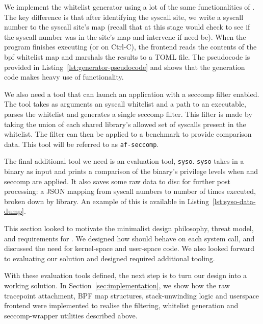 We implement the whitelist generator using a lot of the same functionalities of
\af. The key difference is that after identifying the syscall site, we write a
syscall number to the syscall site's map (recall that at this stage \af would
check to see if the syscall number was in the site's map and intervene if need
be). When the program finishes executing (or on Ctrl-C), the frontend reads the
contents of the bpf whitelist map and marshals the results to a TOML file.
The pseudocode is provided in Listing~\ref{lst:generator-pseudocode} and shows
that the generation code makes heavy use of \afg functionality.

We also need a tool that can launch an application with a seccomp filter enabled.
The tool takes as arguments an \af syscall whitelist
and a path to an executable, parses the whitelist and generates a single
seccomp filter. This filter is made by taking the union of each shared 
library's allowed set of syscalls present in the \af whitelist. The filter can
then be applied to a benchmark to provide comparison data. This tool will be
referred to as \texttt{af-seccomp}.

The final additional tool we need is an evaluation tool, \texttt{syso}.
\texttt{syso} takes in a binary as input and prints a comparison of the 
binary's privilege levels  when \af and seccomp are applied. It also saves
some raw data to disc for further post processing: a JSON mapping from
syscall numbers to number of times executed, broken down by library. An
example of this is available in Listing~\ref{lst:syso-data-dump}.

This section looked to motivate the minimalist design philosophy, threat model,
and requirements for \af. We designed how \af should behave on each system call,
and discussed the need for kernel-space and user-space code. We also looked
forward to evaluating our solution and designed required additional tooling.

With these evaluation tools defined, the next step is to turn our design into a
working solution. In Section \ref{sec:implementation}, we show how the raw 
tracepoint attachment, BPF map structures, stack-unwinding logic and userspace 
frontend were implemented to realise the filtering, whitelist generation and 
seccomp-wrapper utilities described above.
